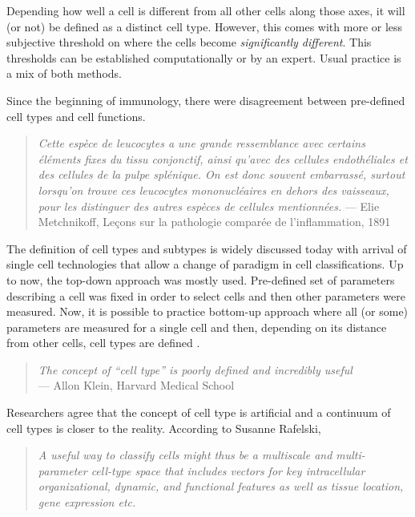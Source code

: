 \documentclass[12pt,]{book}
\theoremstyle{definition}
\theoremstyle{definition}
\theoremstyle{definition}
\theoremstyle{remark}
\begin{document}
Depending how well a cell is different from all other cells along those
axes, it will (or not) be defined as a distinct cell type. However, this
comes with more or less subjective threshold on where the cells become
\emph{significantly different}. This thresholds can be established
computationally or by an expert. Usual practice is a mix of both
methods.

Since the beginning of immunology, there were disagreement between
pre-defined cell types and cell functions.

\begin{quote}
\emph{Cette espèce de leucocytes a une grande ressemblance avec certains
éléments fixes du tissu conjonctif, ainsi qu'avec des cellules
endothéliales et des cellules de la pulpe splénique. On est donc souvent
embarrassé, surtout lorsqu'on trouve ces leucocytes mononucléaires en
dehors des vaisseaux, pour les distinguer des autres espèces de cellules
mentionnées.} --- Elie Metchnikoff, Leçons sur la pathologie comparée de
l'inflammation, 1891
\end{quote}

The definition of cell types and subtypes is widely discussed today with
arrival of single cell technologies that allow a change of paradigm in
cell classifications. Up to now, the top-down approach was mostly used.
Pre-defined set of parameters describing a cell was fixed in order to
select cells and then other parameters were measured. Now, it is
possible to practice bottom-up approach where all (or some) parameters
are measured for a single cell and then, depending on its distance from
other cells, cell types are defined \citep{Satija2014}.

\begin{quote}
\emph{The concept of ``cell type'' is poorly defined and incredibly
useful}\\
--- Allon Klein, Harvard Medical School
\end{quote}

Researchers agree that the concept of cell type is artificial and a
continuum of cell types is closer to the reality. According to Susanne
Rafelski,

\begin{quote}
\emph{A useful way to classify cells might thus be a multiscale and
multi- parameter cell-type space that includes vectors for key
intracellular organizational, dynamic, and functional features as well
as tissue location, gene expression etc.}
\end{quote}
\end{document}
